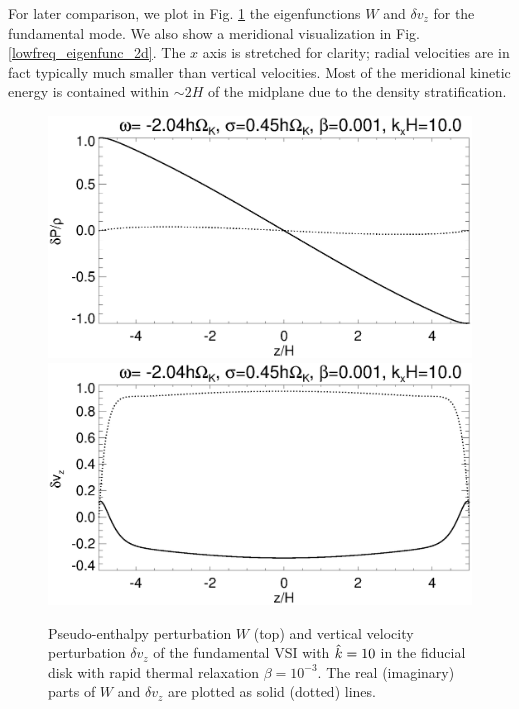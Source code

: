 For later comparison, we plot in Fig. \ref{lowfreq_eigenfunc} the 
eigenfunctions $W$ and $\delta   v_z$ for the fundamental mode. We also show a 
meridional visualization in Fig. \ref{lowfreq_eigenfunc_2d}. The $x$ axis is 
stretched for clarity; radial velocities are in fact typically much 
smaller than vertical velocities. Most of the meridional kinetic energy is
contained within $\sim 2H$ of the midplane due to the density 
stratification. 

\begin{figure}
  \includegraphics[width=\linewidth,clip=true,trim=0cm 1.75cm 0cm
  0cm]{figures/eigenvectorW_iso} 
  \includegraphics[width=\linewidth,clip=true,trim=0cm 0cm 0cm
  1cm]{figures/eigenvectorvz_iso}
  \caption{Pseudo-enthalpy perturbation $W$ (top) and vertical velocity
    perturbation $\delta v_z$ of the fundamental VSI with 
    $\hat{k}=10$ in the fiducial disk with rapid thermal relaxation $\beta=10^{-3}$. The real  
    (imaginary) parts of $W$ and $\delta v_z$ are plotted as solid 
    (dotted) lines.  
    \label{lowfreq_eigenfunc}
  }
\end{figure}

